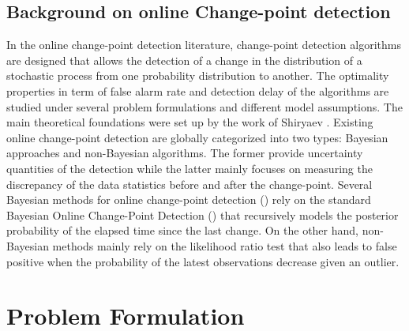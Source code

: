 \documentclass{article} %
\newcommand{\indep}{\perp \!\!\! \perp}
\begin{document}
\subsection{Background on online Change-point detection}

In the online change-point detection literature, change-point detection algorithms are designed that allows the detection of a change in the distribution of a stochastic process from one probability distribution to another. The optimality properties in term of false alarm rate and detection delay of the algorithms are studied under several problem formulations and different model assumptions. The main theoretical foundations were set up by the work of Shiryaev \cite{shiryaev1963optimum}. Existing online change-point detection are globally categorized into two types: Bayesian approaches and non-Bayesian algorithms. The former provide uncertainty quantities of the detection while the latter mainly focuses on measuring the discrepancy of the data statistics before and after the change-point. Several Bayesian methods for online change-point detection (\cite{alami20a, bayesianUAI, knoblauch2018spatio,saatcci2010gaussian}) rely on the standard Bayesian Online Change-Point Detection (\cite{fearnhead2007line}) that recursively models the posterior probability of the elapsed time since the last change. On the other hand, non-Bayesian methods mainly rely on the likelihood ratio test \cite{severo2006change, pmlr-v98-maillard19a, page1954continuous} that also leads to false positive when the probability of the latest observations decrease given an outlier. 

\vspace{-1em}

\section{Problem Formulation}
\label{sec: setting}
\begin{comment}
Before stating the problem formulation, let's introduce some useful notations used in the paper.

\paragraph{Notation}
We denote by $[n]$ the discrete set $\{1,2,..,n\}$, by $\indFct{E}$ the indicator function of event $E$. For complexity measures, we adopt the asymptotic notations $\order{}, \Omega(.)$, as introduced in \cite{cormen2022introduction}. When logarithmic factors are dropped, $\tilde{\mathcal{O}}(.), \tilde{\Omega}(.)$ are used respectively. For random variables $X$ and $Y$, we denote by $X \indep Y$ that $X$ and $Y$ are independent. In a similar way, for a random variable $Z$, $X \indep Y | Z$ denotes that $X$ and $Y$ are independent given $Z$.\\
    
\end{comment}
\end{document}
